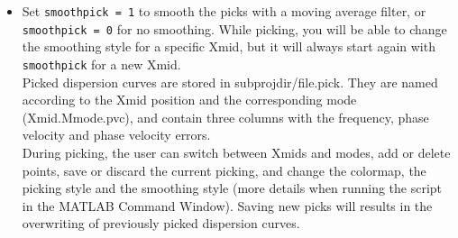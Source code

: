 \documentclass[twoside,a4paper]{article}
\begin{document}
\begin{itemize}
\item Set \verb|smoothpick = 1| to smooth the picks with a moving average filter, or \verb|smoothpick = 0| for no smoothing. While picking, you will be able to change the smoothing style for a specific Xmid, but it will always start again with \verb|smoothpick| for a new Xmid.\\[2ex]
%
Picked dispersion curves are stored in subprojdir/file.pick. They are named according to the Xmid position and the corresponding mode (Xmid.Mmode.pvc), and contain three columns with the frequency, phase velocity and phase velocity errors.\\[2ex]
%
During picking, the user can switch between Xmids and modes, add or delete points, save or discard the current picking, and change the colormap, the picking style and the smoothing style (more details when running the script in the MATLAB Command Window). Saving new picks will results in the overwriting of previously picked dispersion curves.

\end{itemize}
\end{document}
